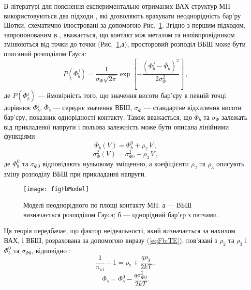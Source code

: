 В літературі для пояснення експериментально отриманих ВАХ структур МН використовуються два
підходи \cite{Sarpatwari, Tascioglu2010, Yildirim2010, Mamor, Iucolano2007JAP, Iucolano2007APL}, які дозволяють
врахувати неоднорідність бар'ру Шотки,
схематично ілюстровані за допомогою Рис.~\ref{figFbModel}.
Згідно з першим підходом, запропонованим в \cite{Werner}, вважається, що контакт між металом та напівпровідником
змінюються від точки до точки (Рис.~\ref{figFbModel},а),  просторовий розподіл ВБШ  може бути описаний розподілом Гауса:
\begin{equation}\label{eqFbWerner}
  P(\Phi_{b}^j)=\frac{1}{\sigma_\Phi\sqrt{2\pi}}\exp\left[-\frac{(\Phi_{b}^j-\overline{\Phi}_{b})^2}{2\sigma_\Phi^2}\right]\,,
\end{equation}
де
$P(\Phi_{b}^j)$ --- ймовірність того, що значення висоти бар'єру в певній точці дорівнює $\Phi_{b}^j$,
$\overline{\Phi}_{b}$ --- середнє значення ВБШ,
$\sigma_\Phi$ --- стандартне відхилення висоти бар'єру, показник однорідності контакту.
Також вважається, що $\overline{\Phi}_{b}$ та $\sigma_\Phi$ залежать
від прикладеної напруги і польова залежність може бути описана лінійними функціями
\begin{equation}\label{eqFbV}
   \overline{\Phi}_{b}(V)=\Phi_{b}^0+\rho_2\,V\,,
\end{equation}
\begin{equation}\label{eqNV}
   \sigma_\Phi^2(V)=\sigma_{\Phi0}^2+\rho_3\,V\,,
\end{equation}
де
$\Phi_{b}^0$ та $\sigma_{\Phi0}$ відповідають нульовому зміщенню,
а коефіцієнти $\rho_2$ та $\rho_3$ описують зміну розподілу ВБШ при прикладанні напруги.

\begin{figure}
\center
\texttt{[image: figFbModel]}
\caption{\label{figFbModel}
Моделі неоднорідного по площі контакту МН:
а --- ВБШ визначається розподілом Гауса;
б --- однорідний бар'єр з патчами.
}%
\end{figure}

Ця теорія передбачає,
що фактор неідеальності, який визначається за нахилом ВАХ, і ВБШ, розрахована за допомогою виразу (\ref{eqFb:TE}),
пов'язані з $\rho_2$ та $\rho_3$ і
$\Phi_{b}^0$ та $\sigma_{\Phi0}$, відповідно \cite{Werner,Tascioglu2010,Yildirim2010,Mamor,Soylu}:
\begin{equation}\label{eqNidT}
  \frac{1}{n_\mathrm{id}}-1=\rho_2+\frac{q\rho_3}{2kT}\,,
\end{equation}
\begin{equation}\label{eqFb0T}
\Phi_b=\Phi_b^0-\frac{q\sigma^2_{\Phi0}}{2kT}.
\end{equation}

